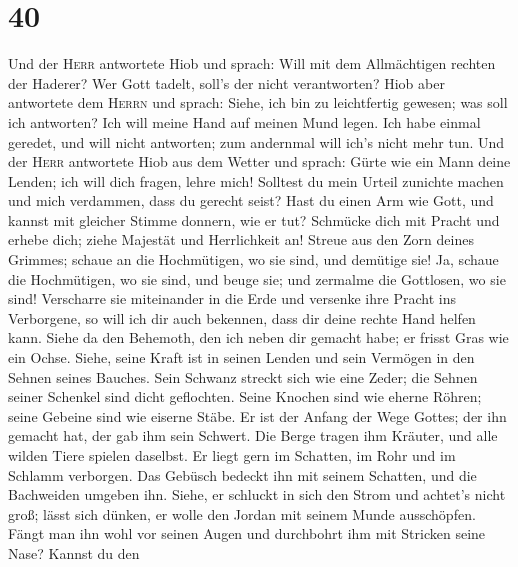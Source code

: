 \hypertarget{section-39}{%
\section{40}\label{section-39}}

 Und der \textsc{Herr} antwortete Hiob und sprach:
 Will mit dem Allmächtigen rechten der Haderer? Wer Gott
tadelt, soll's der nicht verantworten?  Hiob aber
antwortete dem \textsc{Herrn} und sprach:  Siehe, ich bin
zu leichtfertig gewesen; was soll ich antworten? Ich will meine Hand auf
meinen Mund legen.  Ich habe einmal geredet, und will
nicht antworten; zum andernmal will ich's nicht mehr tun. 
Und der \textsc{Herr} antwortete Hiob aus dem Wetter und sprach:
 Gürte wie ein Mann deine Lenden; ich will dich fragen,
lehre mich!  Solltest du mein Urteil zunichte machen und
mich verdammen, dass du gerecht seist?  Hast du einen Arm
wie Gott, und kannst mit gleicher Stimme donnern, wie er tut?
 Schmücke dich mit Pracht und erhebe dich; ziehe Majestät
und Herrlichkeit an!  Streue aus den Zorn deines Grimmes;
schaue an die Hochmütigen, wo sie sind, und demütige sie!
 Ja, schaue die Hochmütigen, wo sie sind, und beuge sie;
und zermalme die Gottlosen, wo sie sind!  Verscharre sie
miteinander in die Erde und versenke ihre Pracht ins Verborgene,
 so will ich dir auch bekennen, dass dir deine rechte
Hand helfen kann.  Siehe da den Behemoth, den ich neben
dir gemacht habe; er frisst Gras wie ein Ochse.  Siehe,
seine Kraft ist in seinen Lenden und sein Vermögen in den Sehnen seines
Bauches.  Sein Schwanz streckt sich wie eine Zeder; die
Sehnen seiner Schenkel sind dicht geflochten.  Seine
Knochen sind wie eherne Röhren; seine Gebeine sind wie eiserne Stäbe.
 Er ist der Anfang der Wege Gottes; der ihn gemacht hat,
der gab ihm sein Schwert.  Die Berge tragen ihm Kräuter,
und alle wilden Tiere spielen daselbst.  Er liegt gern im
Schatten, im Rohr und im Schlamm verborgen.  Das Gebüsch
bedeckt ihn mit seinem Schatten, und die Bachweiden umgeben ihn.
 Siehe, er schluckt in sich den Strom und achtet's nicht
groß; lässt sich dünken, er wolle den Jordan mit seinem Munde
ausschöpfen.  Fängt man ihn wohl vor seinen Augen und
durchbohrt ihm mit Stricken seine Nase?  Kannst du den
